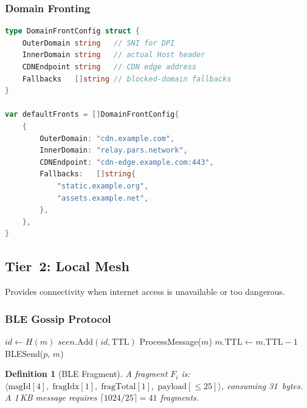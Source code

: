 \documentclass[11pt,a4paper]{article}
\newtheorem{definition}{Definition}[section]
\begin{document}
\subsubsection{Domain Fronting}

\begin{lstlisting}[language=Go,caption={Domain Fronting Configuration}]
type DomainFrontConfig struct {
    OuterDomain string   // SNI for DPI
    InnerDomain string   // actual Host header
    CDNEndpoint string   // CDN edge address
    Fallbacks   []string // blocked-domain fallbacks
}

var defaultFronts = []DomainFrontConfig{
    {
        OuterDomain: "cdn.example.com",
        InnerDomain: "relay.pars.network",
        CDNEndpoint: "cdn-edge.example.com:443",
        Fallbacks:   []string{
            "static.example.org",
            "assets.example.net",
        },
    },
}
\end{lstlisting}

\subsection{Tier~2: Local Mesh}

Provides connectivity when internet access is unavailable or too dangerous.

\subsubsection{BLE Gossip Protocol}

\begin{algorithm}[H]
\caption{BLE Mesh Gossip Protocol}
\label{alg:ble-gossip}
\begin{algorithmic}[1]
    \State $\mathit{id} \gets H(m)$
        \State \Return {}
    \EndIf
    \State $\mathit{seen}.\mathrm{Add}(\mathit{id}, \mathrm{TTL})$
    \State ProcessMessage($m$)
        \State $m.\mathrm{TTL} \gets m.\mathrm{TTL} - 1$
            \State BLESend($p$, $m$) 
        \EndFor
    \EndIf
\EndFunction
\end{algorithmic}
\end{algorithm}

\begin{definition}[BLE Fragment]
    A fragment $F_i$ is:
    $\langle \mathrm{msgId}[4],\; \mathrm{fragIdx}[1],\;
    \mathrm{fragTotal}[1],\; \mathrm{payload}[\leq 25] \rangle$,
    consuming 31~bytes.  A 1\,KB message requires
    $\lceil 1024/25 \rceil = 41$ fragments.
\end{definition}
\end{document}
